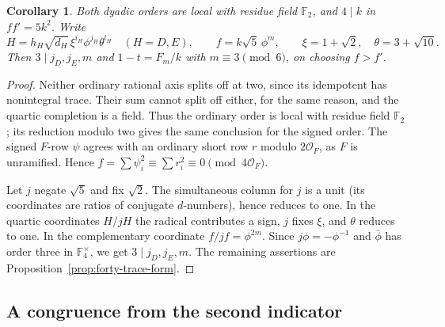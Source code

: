 \documentclass[11pt,reqno]{amsart}
\newtheorem{corollary}[theorem]{Corollary}
\theoremstyle{remark}\newtheorem{remark}[theorem]{Remark}
\numberwithin{equation}{section}
\begin{document}
\begin{corollary}\label{cor:forty-dyadic-scalar}\label{prop:forty-golden-period}
Both dyadic orders are local with residue field $\mathbb F_2$, and
$4\mid k$ in $ff'=5k^2$. Write
\[
 H=h_H\sqrt{d_H}\,\xi^{i_H}\phi^{j_H}\theta^{l_H}\quad(H=D,E),
 \qquad f=k\sqrt5\,\phi^m,
 \qquad \xi=1+\sqrt2,\quad\theta=3+\sqrt{10}.
\]
Then $3\mid j_D,j_E,m$ and $1-t=F_m/k$ with $m\equiv3\pmod6$,
on choosing $f>f'$.
\end{corollary}
\begin{proof}
Neither ordinary rational axis splits off at two, since its idempotent
has nonintegral trace. Their sum cannot split off either, for the same
reason, and the quartic completion is a field. Thus the ordinary
order is local with residue field $\mathbb F_2$; its reduction
modulo two gives the same conclusion for the signed order.
The signed $F$-row $\psi$ agrees with an ordinary short row $r$
modulo $2\mathcal O_F$, as $F$ is unramified. Hence
$f=\sum\psi_i^2\equiv\sum r_i^2\equiv0\pmod{4\mathcal O_F}$.

Let $j$ negate $\sqrt5$ and fix $\sqrt2$. The simultaneous column
for $j$ is a unit (its coordinates are ratios of conjugate
$d$-numbers), hence reduces to one. In the quartic coordinates
$H/jH$ the radical contributes a sign, $j$ fixes $\xi$, and
$\theta$ reduces to one. In the complementary coordinate
$f/jf=\phi^{2m}$. Since $j\phi=-\phi^{-1}$ and $\bar\phi$ has
order three in $\mathbb F_4^\times$, we get
$3\mid j_D,j_E,m$. The remaining assertions are
Proposition~\ref{prop:forty-trace-form}.
\end{proof}

\subsection{A congruence from the second indicator}
\end{document}
